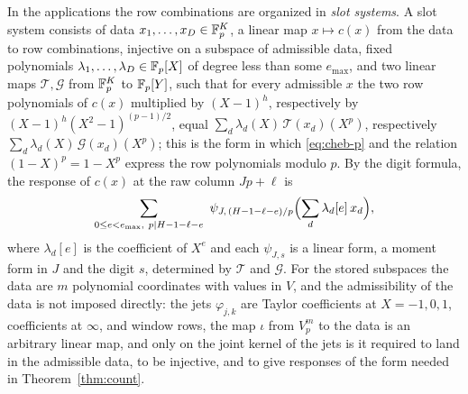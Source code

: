 In the applications the row combinations are organized in \emph{slot systems}. A slot system consists of data
$x_1,\dots,x_D\in\mathbb F_p^K$, a linear map $x\mapsto c(x)$ from the data to row combinations, injective on a
subspace of admissible data, fixed polynomials $\lambda_1,\dots,\lambda_D\in\mathbb F_p[X]$ of degree less than some
$e_{\max}$, and two linear maps $\mathcal T,\mathcal G$ from $\mathbb F_p^K$ to $\mathbb F_p[Y]$, such that for every
admissible $x$ the two row polynomials of $c(x)$ multiplied by $(X-1)^h$, respectively by
$(X-1)^h(X^2-1)^{(p-1)/2}$, equal $\sum_d\lambda_d(X)\,\mathcal T(x_d)(X^p)$, respectively
$\sum_d\lambda_d(X)\,\mathcal G(x_d)(X^p)$; this is the form in which \eqref{eq:cheb-p} and the relation
$(1-X)^p=1-X^p$ express the row polynomials modulo $p$. By the digit formula, the response of $c(x)$ at the
raw column $Jp+\ell$ is
\[
 \sum_{0\le e<e_{\max},\ p\mid H-1-\ell-e}\ \psi_{J,\,(H-1-\ell-e)/p}\Bigl(\sum_d\lambda_d[e]\,x_d\Bigr),
\]
where $\lambda_d[e]$ is the coefficient of $X^e$ and each $\psi_{J,s}$ is a linear form, a moment form in $J$
and the digit $s$, determined by $\mathcal T$ and $\mathcal G$. For the stored subspaces the data are $m$
polynomial coordinates with values in $V$, and the admissibility of the data is not imposed directly: the
jets $\varphi_{j,k}$ are Taylor coefficients at $X=-1,0,1$, coefficients at $\infty$, and window rows, the map
$\iota$ from $V_p^m$ to the data is an arbitrary linear map, and only on the joint kernel of the jets is it
required to land in the admissible data, to be injective, and to give responses of the form needed in
Theorem~\ref{thm:count}.

